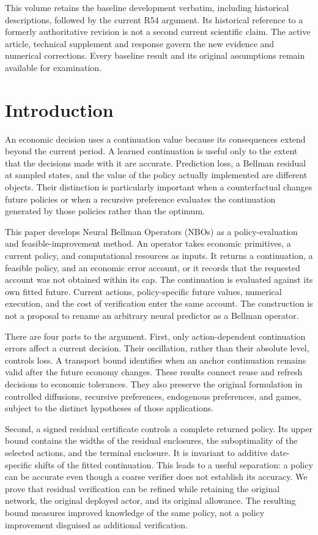 \documentclass[ecta,nameyear,draft]{econsocart}
\begin{document}
This volume retains the baseline development verbatim, including historical descriptions, followed by the current R54 argument. Its historical reference to a formerly authoritative revision is not a second current scientific claim. The active article, technical supplement and response govern the new evidence and numerical corrections. Every baseline result and its original assumptions remain available for examination.


\section{Introduction}\label{sec:introduction}
An economic decision uses a continuation value because its consequences extend beyond the current period. A learned continuation is useful only to the extent that the decisions made with it are accurate. Prediction loss, a Bellman residual at sampled states, and the value of the policy actually implemented are different objects. Their distinction is particularly important when a counterfactual changes future policies or when a recursive preference evaluates the continuation generated by those policies rather than the optimum.

This paper develops Neural Bellman Operators (NBOs) as a policy-evaluation and feasible-improvement method. An operator takes economic primitives, a current policy, and computational resources as inputs. It returns a continuation, a feasible policy, and an economic error account, or it records that the requested account was not obtained within its cap. The continuation is evaluated against its own fitted future. Current actions, policy-specific future values, numerical execution, and the cost of verification enter the same account. The construction is not a proposal to rename an arbitrary neural predictor as a Bellman operator.

There are four parts to the argument. First, only action-dependent continuation errors affect a current decision. Their oscillation, rather than their absolute level, controls loss. A transport bound identifies when an anchor continuation remains valid after the future economy changes. These results connect reuse and refresh decisions to economic tolerances. They also preserve the original formulation in controlled diffusions, recursive preferences, endogenous preferences, and games, subject to the distinct hypotheses of those applications.

Second, a signed residual certificate controls a complete returned policy. Its upper bound contains the widths of the residual enclosures, the suboptimality of the selected actions, and the terminal enclosure. It is invariant to additive date-specific shifts of the fitted continuation. This leads to a useful separation: a policy can be accurate even though a coarse verifier does not establish its accuracy. We prove that residual verification can be refined while retaining the original network, the original deployed actor, and its original allowance. The resulting bound measures improved knowledge of the same policy, not a policy improvement disguised as additional verification.
\end{document}

